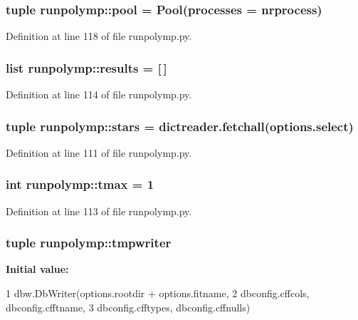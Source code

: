 \hypertarget{namespacerunpolymp_ab3ab11d6f45802c04f361e52f3695bf3}{
\subsubsection[{pool}]{\setlength{\rightskip}{0pt plus 5cm}tuple {\bf runpolymp::pool} = Pool(processes = {\bf nrprocess})}}
\label{namespacerunpolymp_ab3ab11d6f45802c04f361e52f3695bf3}


Definition at line 118 of file runpolymp.py.

\hypertarget{namespacerunpolymp_af260c9116ecebd8a092ec6a918e3742a}{
\subsubsection[{results}]{\setlength{\rightskip}{0pt plus 5cm}list {\bf runpolymp::results} = \mbox{[}$\,$\mbox{]}}}
\label{namespacerunpolymp_af260c9116ecebd8a092ec6a918e3742a}


Definition at line 114 of file runpolymp.py.

\hypertarget{namespacerunpolymp_a953b76537f2a9528d9e7ffdaab48614d}{
\subsubsection[{stars}]{\setlength{\rightskip}{0pt plus 5cm}tuple {\bf runpolymp::stars} = dictreader.fetchall(options.select)}}
\label{namespacerunpolymp_a953b76537f2a9528d9e7ffdaab48614d}


Definition at line 111 of file runpolymp.py.

\hypertarget{namespacerunpolymp_af5937209128980a2d0e0c0b9bb157b85}{
\subsubsection[{tmax}]{\setlength{\rightskip}{0pt plus 5cm}int {\bf runpolymp::tmax} = 1}}
\label{namespacerunpolymp_af5937209128980a2d0e0c0b9bb157b85}


Definition at line 113 of file runpolymp.py.

\hypertarget{namespacerunpolymp_aba94d82f438bb9df93a754960d02b06a}{
\subsubsection[{tmpwriter}]{\setlength{\rightskip}{0pt plus 5cm}tuple {\bf runpolymp::tmpwriter}}}
\label{namespacerunpolymp_aba94d82f438bb9df93a754960d02b06a}
{\bfseries Initial value:}
\begin{DoxyCode}
1 dbw.DbWriter(options.rootdir + options.fitname, 
2                              dbconfig.cffcols, dbconfig.cfftname, 
3                              dbconfig.cfftypes, dbconfig.cffnulls)
\end{DoxyCode}


